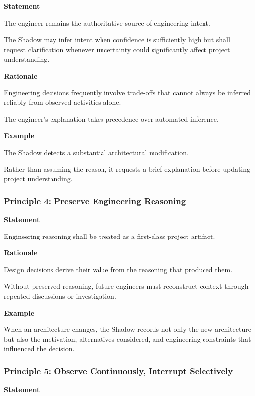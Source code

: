 \textbf{Statement}

The engineer remains the authoritative source of engineering intent.

The Shadow may infer intent when confidence is sufficiently high but shall request clarification whenever uncertainty could significantly affect project understanding.

\textbf{Rationale}

Engineering decisions frequently involve trade-offs that cannot always be inferred reliably from observed activities alone.

The engineer's explanation takes precedence over automated inference.

\textbf{Example}

The Shadow detects a substantial architectural modification.

Rather than assuming the reason, it requests a brief explanation before updating project understanding.

\vspace{0.4cm}

\subsubsection*{Principle 4: Preserve Engineering Reasoning}

\textbf{Statement}

Engineering reasoning shall be treated as a first-class project artifact.

\textbf{Rationale}

Design decisions derive their value from the reasoning that produced them.

Without preserved reasoning, future engineers must reconstruct context through repeated discussions or investigation.

\textbf{Example}

When an architecture changes, the Shadow records not only the new architecture but also the motivation, alternatives considered, and engineering constraints that influenced the decision.

\vspace{0.4cm}

\subsubsection*{Principle 5: Observe Continuously, Interrupt Selectively}

\textbf{Statement}

